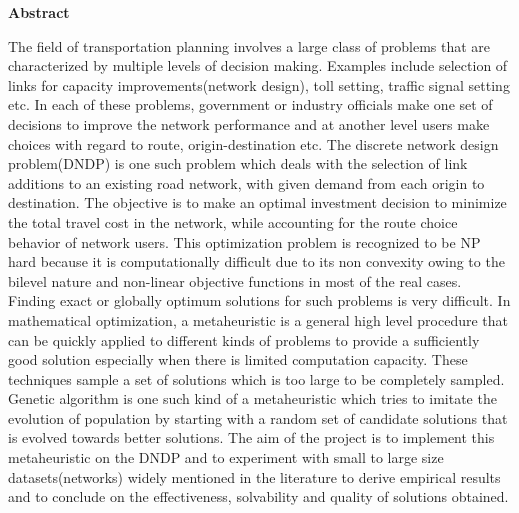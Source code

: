 \documentclass[a4paper, 12pt]{article}
\begin{document}
\begin{center}
\huge \bfseries Abstract
\end{center}
\thispagestyle{empty}
\vspace{35mm}
\noindent
The field of transportation planning involves a large class of problems that are characterized by multiple levels of decision making. Examples include selection of links for capacity improvements(network design), toll setting, traffic signal setting etc. In each of these problems, government or industry officials make one set of decisions to improve the network performance and at another level users make choices with regard to route, origin-destination etc. The discrete network design problem(DNDP) is one such problem which deals with the selection of link additions to an existing road network, with given demand from each origin to destination. The objective is to make an optimal investment decision to minimize the total travel cost in the network, while accounting for the route choice behavior of network users. This optimization problem is recognized to be NP hard because it is computationally difficult due to its non convexity owing to the bilevel nature and non-linear objective functions in most of the real cases. Finding exact or globally optimum solutions for such problems is very difficult. In mathematical optimization, a metaheuristic is a general high level procedure that can be quickly applied to different kinds of problems to provide a sufficiently good solution especially when there is limited computation capacity. These techniques sample a set of solutions which is too large to be completely sampled. Genetic algorithm is one such kind of a metaheuristic which tries to imitate the evolution of population by starting with a random set of candidate solutions that is evolved towards better solutions. The aim of the project is to implement this metaheuristic on the DNDP and to experiment with small to large size datasets(networks) widely mentioned in the literature to derive empirical results and to conclude on the effectiveness, solvability and quality of solutions obtained.

\newpage
\thispagestyle{empty}
\tableofcontents
\newpage
\listoffigures
\newpage
\listoftables
\clearpage

\setcounter{page}{1}
\end{document}
